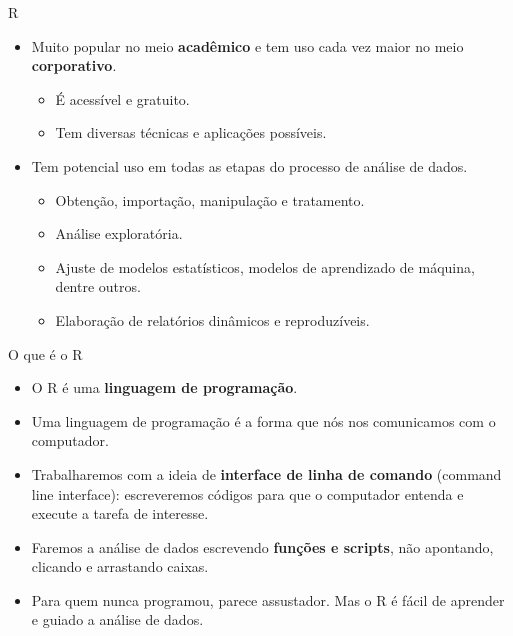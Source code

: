 \documentclass[
  ignorenonframetext,
  serif,
  professionalfont,
  usenames,
  dvipsnames,
  aspectratio = 169]{beamer}
\providecommand{\tightlist}{%
  \setlength{\itemsep}{0pt}\setlength{\parskip}{0pt}}
\renewcommand{\tightlist}{%
  \setlength{\itemsep}{0\baselineskip}
  \setlength{\parskip}{0.25\baselineskip}
}
\begin{document}
\begin{frame}{R}
\label{r-1}
\begin{itemize}
\tightlist
\item
  Muito popular no meio \textbf{acadêmico} e tem uso cada vez maior no
  meio \textbf{corporativo}.

  \begin{itemize}
  \tightlist
  \item
    É acessível e gratuito.
  \item
    Tem diversas técnicas e aplicações possíveis.
  \end{itemize}
\end{itemize}

\vspace{0.3cm}

\begin{itemize}
\tightlist
\item
  Tem potencial uso em todas as etapas do processo de análise de dados.

  \begin{itemize}
  \tightlist
  \item
    Obtenção, importação, manipulação e tratamento.
  \item
    Análise exploratória.
  \item
    Ajuste de modelos estatísticos, modelos de aprendizado de máquina,
    dentre outros.
  \item
    Elaboração de relatórios dinâmicos e reproduzíveis.
  \end{itemize}
\end{itemize}
\end{frame}

\begin{frame}{O que é o R}
\label{o-que-uxe9-o-r}
\begin{itemize}
\item
  O R é uma \textbf{linguagem de programação}.
\item
  Uma linguagem de programação é a forma que nós nos comunicamos com o
  computador.
\item
  Trabalharemos com a ideia de \textbf{interface de linha de comando}
  (command line interface): escreveremos códigos para que o computador
  entenda e execute a tarefa de interesse.
\item
  Faremos a análise de dados escrevendo \textbf{funções e scripts}, não
  apontando, clicando e arrastando caixas.
\item
  Para quem nunca programou, parece assustador. Mas o R é fácil de
  aprender e guiado a análise de dados.
\end{itemize}
\end{frame}
\end{document}
